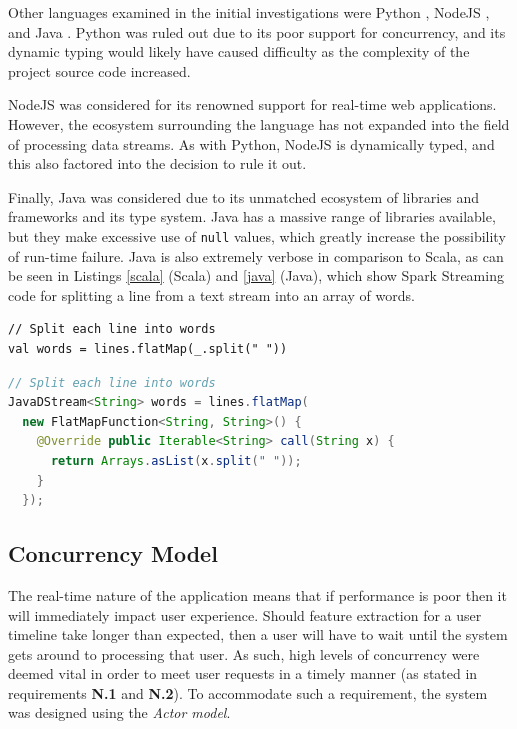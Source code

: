 \documentclass{l4proj}
\newcommand{\code}[1]{\texttt{#1}}
\begin{document}
        Other languages examined in the initial investigations were Python \cite{python}, NodeJS \cite{node}, and Java \cite{java}. Python was ruled out due to its poor support for concurrency, and its dynamic typing would likely have caused difficulty as the complexity of the project source code increased. 
        
        NodeJS was considered for its renowned support for real-time web applications. However, the ecosystem surrounding the language has not expanded into the field of processing data streams. As with Python, NodeJS is dynamically typed, and this also factored into the decision to rule it out. 
        
        Finally, Java was considered due to its unmatched ecosystem of libraries and frameworks and its type system. Java has a massive range of libraries available, but they make excessive use of \code{null} values, which greatly increase the possibility of run-time failure. Java is also extremely verbose in comparison to Scala, as can be seen in Listings \ref{scala} (Scala) and \ref{java} (Java), which show Spark Streaming code for splitting a line from a text stream into an array of words.

\begin{lstlisting}[caption=Scala example of splitting a line in Spark Streaming.,label=scala]
// Split each line into words
val words = lines.flatMap(_.split(" "))
\end{lstlisting}

\begin{lstlisting}[language=Java,caption=Java example of splitting a line in Spark Streaming,label=java]
// Split each line into words
JavaDStream<String> words = lines.flatMap(
  new FlatMapFunction<String, String>() {
    @Override public Iterable<String> call(String x) {
      return Arrays.asList(x.split(" "));
    }
  });
\end{lstlisting}




    \subsection{Concurrency Model}
    
    The real-time nature of the application means that if performance is poor then it will immediately impact user experience. Should feature extraction for a user timeline take longer than expected, then a user will have to wait until the system gets around to processing that user. As such, high levels of concurrency were deemed vital in order to meet user requests in a timely manner (as stated in requirements \textbf{N.1} and \textbf{N.2}). To accommodate such a requirement, the system was designed using the \textit{Actor model}.
    
\end{document}
